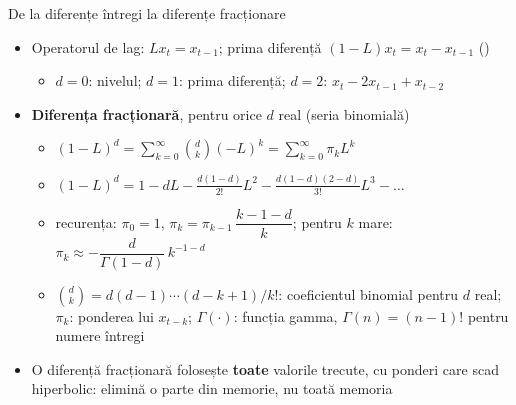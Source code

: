 \begin{frame}{De la diferențe întregi la diferențe fracționare}
\itemsize{\small}
\begin{itemize}
    \item Operatorul de lag: $Lx_t = x_{t-1}$; prima diferență $(1-L)x_t = x_t - x_{t-1}$ ()
    \begin{itemize}
        \item $d = 0$: nivelul; $d = 1$: prima diferență; $d = 2$: $x_t - 2x_{t-1} + x_{t-2}$
    \end{itemize}
    \item \textbf{Diferența fracționară}, pentru orice $d$ real (seria binomială)
    \begin{itemize}
        \item $(1-L)^d = \sum_{k=0}^{\infty}\binom{d}{k}(-L)^k = \sum_{k=0}^{\infty}\pi_k L^k$
        \item $(1-L)^d = 1 - dL - \frac{d(1-d)}{2!}L^2 - \frac{d(1-d)(2-d)}{3!}L^3 - \dots$
        \item recurența: $\pi_0 = 1$, $\pi_k = \pi_{k-1}\,\dfrac{k - 1 - d}{k}$; pentru $k$ mare: $\pi_k \approx -\dfrac{d}{\Gamma(1-d)}\,k^{-1-d}$
        \item $\binom{d}{k} = d(d-1)\cdots(d-k+1)/k!$: coeficientul binomial pentru $d$ real; $\pi_k$: ponderea lui $x_{t-k}$; $\Gamma(\cdot)$: funcția gamma, $\Gamma(n) = (n-1)!$ pentru numere întregi
    \end{itemize}
    \item O diferență fracționară folosește \textbf{toate} valorile trecute, cu ponderi care scad hiperbolic: elimină o parte din memorie, nu toată memoria
\end{itemize}
\end{frame}

